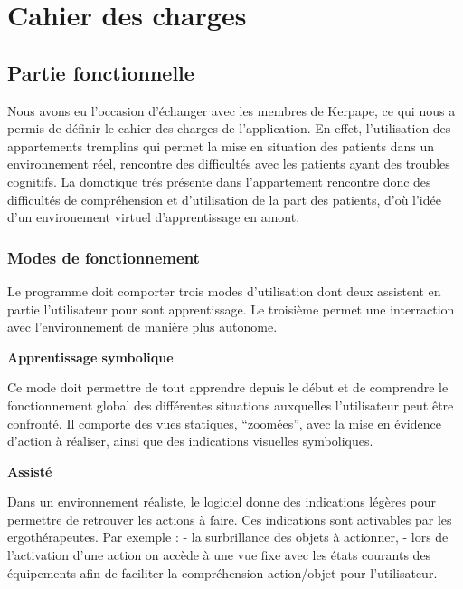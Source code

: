 
\section{Cahier des charges}
\subsection{Partie fonctionnelle}
  
Nous avons eu l’occasion d’échanger avec les membres de Kerpape, ce qui nous a permis de définir le cahier des charges de l’application.\newline
En effet, l'utilisation des appartements tremplins qui permet la mise en situation des patients dans un environnement réel, rencontre des difficultés avec les patients ayant des troubles cognitifs. La domotique trés présente dans l'appartement rencontre donc des difficultés de compréhension et d’utilisation de la part des patients, d'où l'idée d'un environement virtuel d'apprentissage en amont.

\subsubsection{Modes de fonctionnement}

Le programme doit comporter trois modes d’utilisation dont deux assistent en partie l’utilisateur pour sont apprentissage. Le troisième permet une interraction avec l'environnement de manière plus autonome.
\newline 

\textbf{Apprentissage symbolique}
\newline 

Ce mode doit permettre de tout apprendre depuis le début et de comprendre le fonctionnement global des différentes situations auxquelles l'utilisateur peut être confronté. Il comporte des vues statiques, “zoomées”, avec la mise en évidence d’action à réaliser, ainsi que des indications visuelles symboliques.
\newline 

\textbf{Assisté}
\newline 

Dans un environnement réaliste, le logiciel donne des indications légères pour permettre de retrouver les actions à faire. Ces indications sont activables par les ergothérapeutes. \newline 
Par exemple :\newline 
- la surbrillance des objets à actionner,\newline 
- lors de l'activation d'une action on accède à une vue fixe avec les états courants des équipements afin de faciliter la compréhension action/objet pour l'utilisateur.
\newline 

